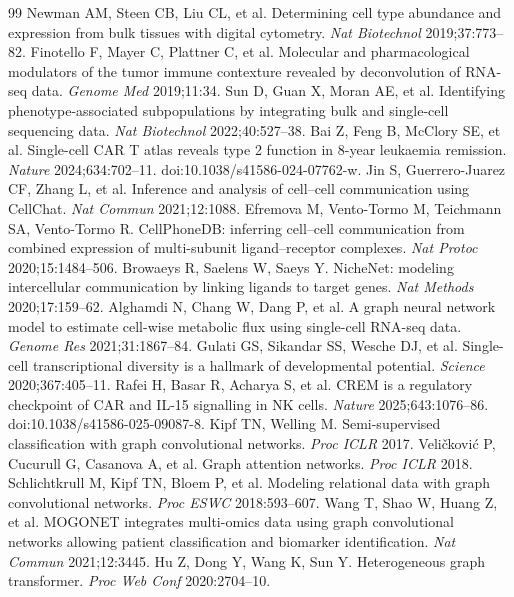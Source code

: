 \documentclass[modern,large,numbered,nocrop]{oup-authoring-template}
\begin{document}
\begin{thebibliography}{99}
 Newman AM, Steen CB, Liu CL, et al. Determining cell type abundance and expression from bulk tissues with digital cytometry. \textit{Nat Biotechnol} 2019;37:773--82.
 Finotello F, Mayer C, Plattner C, et al. Molecular and pharmacological modulators of the tumor immune contexture revealed by deconvolution of RNA-seq data. \textit{Genome Med} 2019;11:34.
 Sun D, Guan X, Moran AE, et al. Identifying phenotype-associated subpopulations by integrating bulk and single-cell sequencing data. \textit{Nat Biotechnol} 2022;40:527--38.
 Bai Z, Feng B, McClory SE, et al. Single-cell CAR T atlas reveals type 2 function in 8-year leukaemia remission. \textit{Nature} 2024;634:702--11. doi:10.1038/s41586-024-07762-w.
 Jin S, Guerrero-Juarez CF, Zhang L, et al. Inference and analysis of cell--cell communication using CellChat. \textit{Nat Commun} 2021;12:1088.
 Efremova M, Vento-Tormo M, Teichmann SA, Vento-Tormo R. CellPhoneDB: inferring cell--cell communication from combined expression of multi-subunit ligand--receptor complexes. \textit{Nat Protoc} 2020;15:1484--506.
 Browaeys R, Saelens W, Saeys Y. NicheNet: modeling intercellular communication by linking ligands to target genes. \textit{Nat Methods} 2020;17:159--62.
 Alghamdi N, Chang W, Dang P, et al. A graph neural network model to estimate cell-wise metabolic flux using single-cell RNA-seq data. \textit{Genome Res} 2021;31:1867--84.
 Gulati GS, Sikandar SS, Wesche DJ, et al. Single-cell transcriptional diversity is a hallmark of developmental potential. \textit{Science} 2020;367:405--11.
 Rafei H, Basar R, Acharya S, et al. CREM is a regulatory checkpoint of CAR and IL-15 signalling in NK cells. \textit{Nature} 2025;643:1076--86. doi:10.1038/s41586-025-09087-8.
 Kipf TN, Welling M. Semi-supervised classification with graph convolutional networks. \textit{Proc ICLR} 2017.
 Veli\v{c}kovi\'c P, Cucurull G, Casanova A, et al. Graph attention networks. \textit{Proc ICLR} 2018.
 Schlichtkrull M, Kipf TN, Bloem P, et al. Modeling relational data with graph convolutional networks. \textit{Proc ESWC} 2018:593--607.
 Wang T, Shao W, Huang Z, et al. MOGONET integrates multi-omics data using graph convolutional networks allowing patient classification and biomarker identification. \textit{Nat Commun} 2021;12:3445.
 Hu Z, Dong Y, Wang K, Sun Y. Heterogeneous graph transformer. \textit{Proc Web Conf} 2020:2704--10.

\end{thebibliography}
\end{document}
